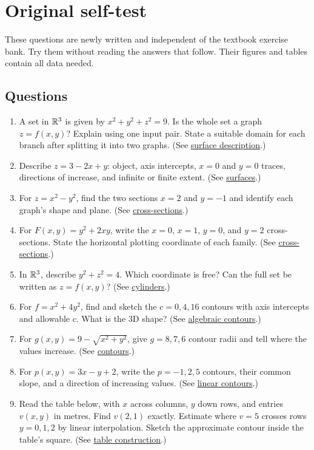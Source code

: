 \section{Original self-test}\label{selftest}
These questions are newly written and independent of the textbook exercise bank. Try them without reading the answers that follow. Their figures and tables contain all data needed.
\subsection*{Questions}
\begin{enumerate}[label=\textbf{Q\arabic*.},leftmargin=*]
\item A set in $\mathbb R^3$ is given by $x^2+y^2+z^2=9$. Is the whole set a graph $z=f(x,y)$? Explain using one input pair. State a suitable domain for each branch after splitting it into two graphs. (See \hyperref[surface]{surface description}.)
\item Describe $z=3-2x+y$: object, axis intercepts, $x=0$ and $y=0$ traces, directions of increase, and infinite or finite extent. (See \hyperref[surface]{surfaces}.)
\item For $z=x^2-y^2$, find the two sections $x=2$ and $y=-1$ and identify each graph's shape and plane. (See \hyperref[cross]{cross-sections}.)
\item For $F(x,y)=y^2+2xy$, write the $x=0$, $x=1$, $y=0$, and $y=2$ cross-sections. State the horizontal plotting coordinate of each family. (See \hyperref[cross]{cross-sections}.)
\item In $\mathbb R^3$, describe $y^2+z^2=4$. Which coordinate is free? Can the full set be written as $z=f(x,y)$? (See \hyperref[cylinder]{cylinders}.)
\item For $f=x^2+4y^2$, find and sketch the $c=0,4,16$ contours with axis intercepts and allowable $c$. What is the 3D shape? (See \hyperref[radial]{algebraic contours}.)
\item For $g(x,y)=9-\sqrt{x^2+y^2}$, give $g=8,7,6$ contour radii and tell where the values increase. (See \hyperref[radial]{contours}.)
\item For $p(x,y)=3x-y+2$, write the $p=-1,2,5$ contours, their common slope, and a direction of increasing values. (See \hyperref[plane]{linear contours}.)
\item Read the table below, with $x$ across columns, $y$ down rows, and entries $v(x,y)$ in metres. Find $v(2,1)$ exactly. Estimate where $v=5$ crosses rows $y=0,1,2$ by linear interpolation. Sketch the approximate contour inside the table's square. (See \hyperref[table]{table construction}.)

\end{enumerate}
